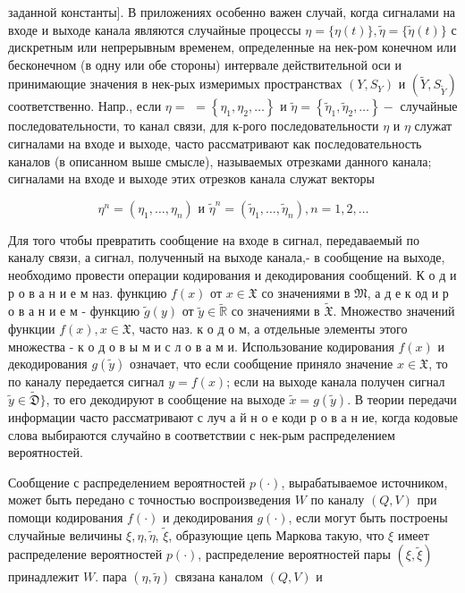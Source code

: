 \documentclass[10pt]{article}
\begin{document}
заданной константы]. В приложениях особенно важен случай, когда сигналами на входе и выходе канала являются случайные процессы $\eta=\{\eta(t)\}, \tilde{\eta}=\{\tilde{\eta}(t)\}$ с дискретным или непрерывным временем, определенные на нек-ром конечном или бесконечном (в одну или обе стороны) интервале действительной оси и принимающие значения в нек-рых измеримых пространствах $\left(Y, S_{Y}\right)$ и $\left(\tilde{Y}, S_{\tilde{Y}}\right)$ соответственно. Напр., если $\eta=$ $=\left\{\eta_{1}, \eta_{2}, \ldots\right\}$ и $\tilde{\eta}=\left\{\tilde{\eta}_{1}, \tilde{\eta}_{2}, \ldots\right\}-$ случайные последовательности, то канал связи, для к-рого последовательности $\eta$ и $\eta$ служат сигналами на входе и выходе, часто рассматривают как последовательность каналов (в описанном выше смысле), называемых отрезками данного канала; сигналами на входе и выходе этих отрезков канала служат векторы



\[

\eta^{n}=\left(\eta_{1}, \ldots, \eta_{n}\right) \text { и } \tilde{\eta}^{n}=\left(\tilde{\eta}_{1}, \ldots, \tilde{\eta}_{n}\right), n=1,2, \ldots

\]



Для того чтобы превратить сообщение на входе в сигнал, передаваемый по каналу связи, а сигнал, полученный на выходе канала,- в сообщение на выходе, необходимо провести операции кодирования и декодирования сообщений. К о д и р о в а н и е м наз. функцию $f(x)$ от $x \in \mathfrak{X}$ со значениями в $\mathfrak{M}$, а д е к од и р о в а н и е м - функцию $\tilde{g}(y)$ от $\tilde{y} \in \tilde{\mathbb{R}}$ со значениями в $\tilde{\mathfrak{X}}$. Множество значений функции $f(x), x \in \mathfrak{X}$, часто наз. к о д о м, а отдельные элементы этого множества - к о д о в ы м и с л о в а м и. Использование кодирования $f(x)$ и декодирования $g(\tilde{y})$ означает, что если сообщение приняло значение $x \in \mathfrak{X}$, то по каналу передается сигнал $y=f(x)$; если на выходе канала получен сигнал $\tilde{y} \in \tilde{\mathfrak{D}}\}$, то его декодируют в сообщение на выходе $\tilde{x}=g(\tilde{y})$. В теории передачи информации часто рассматривают с луч а й н о е коди р о в а н ие, когда кодовые слова выбираются случайно в соответствии с нек-рым распределением вероятностей.



Сообщение с распределением вероятностей $p(\cdot)$, вырабатываемое источником, может быть передано с точностью воспроизведения $W$ по каналу $(Q, V)$ при помощи кодирования $f(\cdot)$ и декодирования $g(\cdot)$, если могут быть построены случайные величины $\xi, \eta, \tilde{\eta}$, $\tilde{\xi}$, образующие цепь Маркова такую, что $\xi$ имеет распределение вероятностей $p(\cdot)$, распределение вероятностей пары $(\xi, \tilde{\xi})$ принадлежит $W$. пара $(\eta, \tilde{\eta})$ связана каналом $(Q, V)$ и
\end{document}
